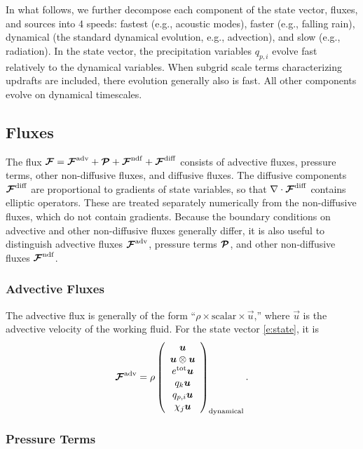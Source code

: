 \documentclass{article}
\begin{document}
In what follows, we further decompose each component of the state vector, fluxes, and sources into 4 speeds: fastest (e.g., acoustic modes), faster (e.g., falling rain), dynamical (the standard dynamical evolution, e.g., advection), and slow (e.g., radiation). In the state vector, the precipitation variables $q_{p,i}$ evolve fast relatively to the dynamical variables. When subgrid scale terms characterizing updrafts are included, there evolution generally also is fast. All other components evolve on dynamical timescales.  

\subsection{Fluxes}

The flux $\boldsymbol{{\mathcal{F}}}=\boldsymbol{{\mathcal{F}}}^{\mathrm{adv}} + \boldsymbol{{\mathcal{P}}} + \boldsymbol{{\mathcal{F}}}^{\mathrm{ndf}} + \boldsymbol{{\mathcal{F}}}^{\mathrm{diff}}$ consists of advective fluxes, pressure terms, other non-diffusive fluxes, and diffusive fluxes. The diffusive components $\boldsymbol{{\mathcal{F}}}^{\mathrm{diff}}$ are proportional to gradients of state variables, so that $\nabla \cdot \boldsymbol{{\mathcal{F}}}^{\mathrm{diff}}$ contains elliptic operators. These are treated separately numerically from the non-diffusive fluxes, which do not contain gradients. Because the boundary conditions on advective and other non-diffusive fluxes generally differ, it is also useful to distinguish advective fluxes $\boldsymbol{{\mathcal{F}}}^{\mathrm{adv}}$, pressure terms $\boldsymbol{{\mathcal{P}}}$, and other non-diffusive fluxes $\boldsymbol{{\mathcal{F}}}^{\mathrm{ndf}}$. 

\subsubsection{Advective Fluxes}

The advective flux is generally of the form ``$\rho \times \mathrm{scalar} \times \vec{u}$,'' where $\vec{u}$ is the advective velocity of the working fluid. For the state vector \eqref{e:state}, it is 
 \begin{equation}
 \label{e:adv_flux}
 \boldsymbol{{\mathcal{F}}}^{\mathrm{adv}}=\rho \left( \begin{array}{c}
 \boldsymbol{{u}} \\
 \boldsymbol{{u}} \otimes \boldsymbol{{u}} \\
 e^{\mathrm{tot}} \boldsymbol{{u}}\\
q_k \boldsymbol{{u}}\\
q_{p,i} \boldsymbol{{u}} \\
\chi_j \boldsymbol{{u}}
\end{array}
\right)_{\mathrm{dynamical}}.
 \end{equation}

\subsubsection{Pressure Terms}
\end{document}
